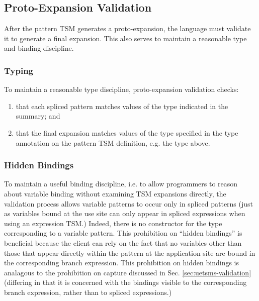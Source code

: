 {{{%

\subsection{Proto-Expansion Validation}\label{sec:ptsms-validation}
After the pattern TSM generates a proto-expansion, the language must validate it to generate a final expansion. This also serves to maintain a reasonable type and binding discipline.

\subsubsection{Typing}
To maintain a reasonable type discipline, proto-expansion validation  checks:
\begin{enumerate}
\item that each spliced pattern matches values of the type indicated in the summary; and
\item that the final expansion matches values of the type specified in the type annotation on the pattern TSM definition, e.g. the type  above.
\end{enumerate}

\subsubsection{Hidden Bindings}\label{sec:ptsms-hygiene}
To maintain a useful binding discipline, i.e. to allow programmers to reason about variable binding without examining TSM expansions directly, the validation process allows variable patterns to occur only in spliced patterns (just as variables bound at the use site can only appear in spliced expressions when using an expression TSM.) Indeed, there is no constructor for the type  corresponding to a variable pattern. This prohibition on ``hidden bindings'' is beneficial because the client can rely on the fact that no variables other than those that appear directly within the pattern at the application site are bound in the corresponding branch expression. This prohibition on hidden bindings is analagous to the prohibition on capture discussed in Sec. \ref{sec:uetsms-validation} (differing in that it is concerned with the bindings visible to the corresponding branch expression, rather than to spliced expressions.)

}}}
